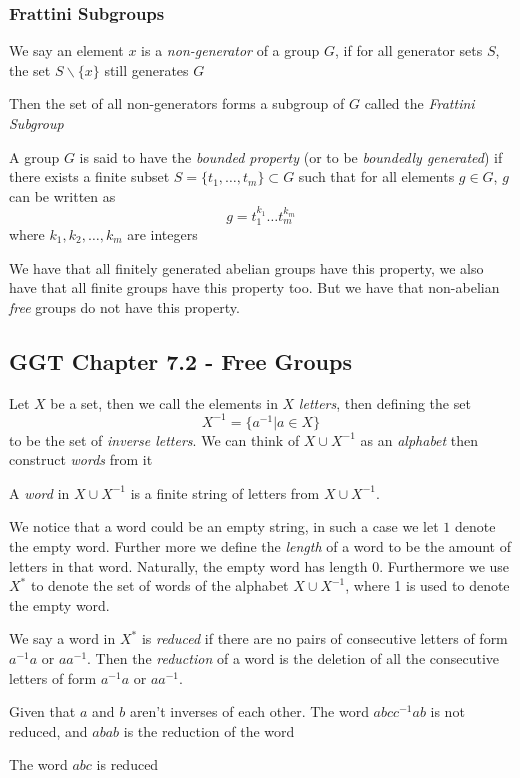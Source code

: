     \subsubsection{Frattini Subgroups}
    \begin{definition}
        We say an element $x$ is a \textit{non-generator} of a group $G$, if for all generator sets $S$, the set $S\backslash\{x\}$ still generates $G$
    \end{definition}
    Then the set of all non-generators forms a subgroup of $G$ called the \textit{Frattini Subgroup}
    \BBreak
    \begin{definition}
        A group $G$ is said to have the \textit{bounded property} (or to be \textit{boundedly generated}) if there exists a finite subset $S=\{t_1,\ldots,t_m\}\subset G$ such that for all elements $g\in G$, $g$ can be written as
        \[g=t_1^{k_1}\ldots t_m^{k_m}\]
        where $k_1,k_2,\ldots,k_m$ are integers
        
    \end{definition}
    We have that all finitely generated abelian groups have this property, we also have that all finite groups have this property too. But we have that non-abelian \textit{free} groups do not have this property.
\subsection{GGT Chapter 7.2 - Free Groups}
Let $X$ be a set, then we call the elements in $X$ \textit{letters}, then defining the set
\[X^{-1}=\{a^{-1}\vert a\in X\}\]
to be the set of \textit{inverse letters}. We can think of $X\cup X^{-1}$ as an \textit{alphabet} then construct \textit{words} from it
\begin{definition}[Words]
    A \textit{word} in $X\cup X^{-1}$ is a finite string of letters from $X\cup X^{-1}$.
\end{definition}
We notice that a word could be an empty string, in such a case we let $1$ denote the empty word. Further more we define the \textit{length} of a word to be the amount of letters in that word. Naturally, the empty word has length 0. Furthermore we use $X^*$ to denote the set of words of the alphabet $X\cup X^{-1}$, where 1 is used to denote the empty word.
\begin{definition}[Reduced]
    We say a word in $X^*$ is \textit{reduced} if there are no pairs of consecutive letters of form $a^{-1}a$ or $aa^{-1}$. Then the \textit{reduction} of a word is the deletion of all the consecutive letters of form $a^{-1}a$ or $aa^{-1}$.
\end{definition}
\begin{example}
    Given that $a$ and $b$ aren't inverses of each other. The word $abcc^{-1}ab$ is not reduced, and $abab$ is the reduction of the word
\end{example}
\begin{example}
    The word $abc$ is reduced
\end{example}

